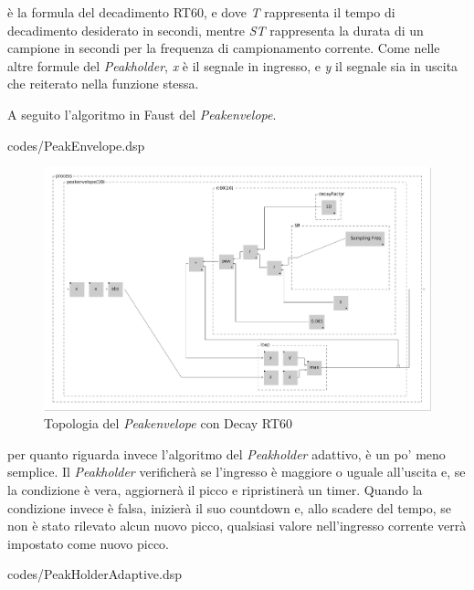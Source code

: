 è la formula del decadimento RT60, 
e dove \textit{T} rappresenta il tempo di decadimento desiderato in secondi, 
mentre \textit{ST} rappresenta la durata di un campione in secondi per la frequenza di campionamento corrente.
Come nelle altre formule del \textit{Peakholder}, \textit{x} è il segnale in ingresso, 
e \textit{y} il segnale sia in uscita che reiterato nella funzione stessa. 

A seguito l'algoritmo in Faust del \textit{Peakenvelope}.

\vspace{0.5cm} 

{codes/PeakEnvelope.dsp}

\begin{figure}[h!]
\begin{center}
    \includegraphics[width=15cm]{figures/PeakEnvelope.pdf}
    \caption{Topologia del \textit{Peakenvelope} con Decay RT60}
\end{center}
\vspace{0.5cm}
\end{figure}

\clearpage

per quanto riguarda invece l'algoritmo del \textit{Peakholder} adattivo, è un po' meno semplice. 
Il \textit{Peakholder} verificherà se l'ingresso è maggiore o uguale all'uscita e, 
se la condizione è vera, aggiornerà il picco e ripristinerà un timer. 
Quando la condizione invece è falsa, 
inizierà il suo countdown e, allo scadere del tempo, se non è stato rilevato alcun nuovo picco, 
qualsiasi valore nell'ingresso corrente verrà impostato come nuovo picco.


{codes/PeakHolderAdaptive.dsp}

